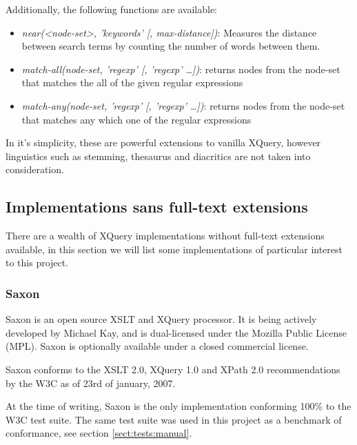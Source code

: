 Additionally, the following functions are available:
\begin{itemize}
  \item \emph{near(<node-set>, 'keywords' [, max-distance])}: Measures the 
  distance between search terms by counting the number of words between 
  them.
  \item \emph{match-all(node-set, 'regexp' [, 'regexp' \ldots])}: returns
  nodes from the node-set that matches the all of the given regular expressions 
  \item \emph{match-any(node-set, 'regexp' [, 'regexp' \ldots])}: returns nodes
  from the node-set that matches any which one of the regular expressions
\end{itemize}

In it's simplicity, these are powerful extensions to vanilla XQuery, however
linguistics such as stemming, thesaurus and diacritics are not taken into
consideration.

\subsection{Implementations sans full-text extensions}
There are a wealth of XQuery implementations without full-text
extensions available, in this section we will list some implementations of
particular interest to this project.
\subsubsection{Saxon}
Saxon is an open source XSLT and XQuery processor. It is being actively
developed by Michael Kay, and is dual-licensed under the Mozilla Public License
(MPL). Saxon is optionally available under a closed commercial license.

Saxon conforms to the XSLT 2.0, XQuery 1.0 and XPath 2.0 recommendations
by the W3C as of 23rd of january, 2007. 

At the time of writing, Saxon is the only implementation conforming 100\% to
the W3C test suite\cite{w3ctestresults}. The same test suite was used in this
project as a benchmark of conformance, see section \ref{sect:tests:manual}.

